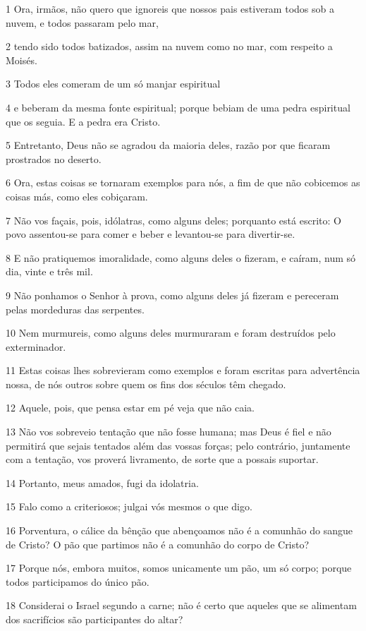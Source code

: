 \par 1 Ora, irmãos, não quero que ignoreis que nossos pais estiveram todos sob a nuvem, e todos passaram pelo mar,
\par 2 tendo sido todos batizados, assim na nuvem como no mar, com respeito a Moisés.
\par 3 Todos eles comeram de um só manjar espiritual
\par 4 e beberam da mesma fonte espiritual; porque bebiam de uma pedra espiritual que os seguia. E a pedra era Cristo.
\par 5 Entretanto, Deus não se agradou da maioria deles, razão por que ficaram prostrados no deserto.
\par 6 Ora, estas coisas se tornaram exemplos para nós, a fim de que não cobicemos as coisas más, como eles cobiçaram.
\par 7 Não vos façais, pois, idólatras, como alguns deles; porquanto está escrito: O povo assentou-se para comer e beber e levantou-se para divertir-se.
\par 8 E não pratiquemos imoralidade, como alguns deles o fizeram, e caíram, num só dia, vinte e três mil.
\par 9 Não ponhamos o Senhor à prova, como alguns deles já fizeram e pereceram pelas mordeduras das serpentes.
\par 10 Nem murmureis, como alguns deles murmuraram e foram destruídos pelo exterminador.
\par 11 Estas coisas lhes sobrevieram como exemplos e foram escritas para advertência nossa, de nós outros sobre quem os fins dos séculos têm chegado.
\par 12 Aquele, pois, que pensa estar em pé veja que não caia.
\par 13 Não vos sobreveio tentação que não fosse humana; mas Deus é fiel e não permitirá que sejais tentados além das vossas forças; pelo contrário, juntamente com a tentação, vos proverá livramento, de sorte que a possais suportar.
\par 14 Portanto, meus amados, fugi da idolatria.
\par 15 Falo como a criteriosos; julgai vós mesmos o que digo.
\par 16 Porventura, o cálice da bênção que abençoamos não é a comunhão do sangue de Cristo? O pão que partimos não é a comunhão do corpo de Cristo?
\par 17 Porque nós, embora muitos, somos unicamente um pão, um só corpo; porque todos participamos do único pão.
\par 18 Considerai o Israel segundo a carne; não é certo que aqueles que se alimentam dos sacrifícios são participantes do altar?
